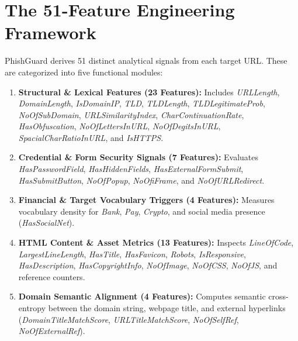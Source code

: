 \documentclass[BTech]{srmuthesis}
\begin{document}
\section{The 51-Feature Engineering Framework}
PhishGuard derives 51 distinct analytical signals from each target URL. These are categorized into five functional modules:
\begin{enumerate}
    \item \textbf{Structural \& Lexical Features (23 Features):} Includes \textit{URLLength}, \textit{DomainLength}, \textit{IsDomainIP}, \textit{TLD}, \textit{TLDLength}, \textit{TLDLegitimateProb}, \textit{NoOfSubDomain}, \textit{URLSimilarityIndex}, \textit{CharContinuationRate}, \textit{HasObfuscation}, \textit{NoOfLettersInURL}, \textit{NoOfDegitsInURL}, \textit{SpacialCharRatioInURL}, and \textit{IsHTTPS}.
    \item \textbf{Credential \& Form Security Signals (7 Features):} Evaluates \textit{HasPasswordField}, \textit{HasHiddenFields}, \textit{HasExternalFormSubmit}, \textit{HasSubmitButton}, \textit{NoOfPopup}, \textit{NoOfiFrame}, and \textit{NoOfURLRedirect}.
    \item \textbf{Financial \& Target Vocabulary Triggers (4 Features):} Measures vocabulary density for \textit{Bank}, \textit{Pay}, \textit{Crypto}, and social media presence (\textit{HasSocialNet}).
    \item \textbf{HTML Content \& Asset Metrics (13 Features):} Inspects \textit{LineOfCode}, \textit{LargestLineLength}, \textit{HasTitle}, \textit{HasFavicon}, \textit{Robots}, \textit{IsResponsive}, \textit{HasDescription}, \textit{HasCopyrightInfo}, \textit{NoOfImage}, \textit{NoOfCSS}, \textit{NoOfJS}, and reference counters.
    \item \textbf{Domain Semantic Alignment (4 Features):} Computes semantic cross-entropy between the domain string, webpage title, and external hyperlinks (\textit{DomainTitleMatchScore}, \textit{URLTitleMatchScore}, \textit{NoOfSelfRef}, \textit{NoOfExternalRef}).
\end{enumerate}
\end{document}
